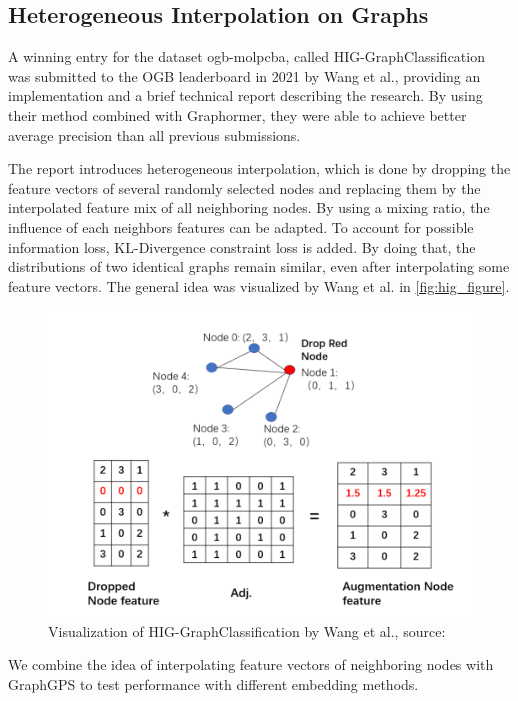 \subsection{Heterogeneous Interpolation on Graphs}
A winning entry for the dataset ogb-molpcba, called HIG-GraphClassification~\cite{tencenc2021Hig,tencenc2021HigPaper} was submitted to the OGB leaderboard in 2021 by Wang et al., providing an implementation and a brief technical report describing the research. By using their method combined with Graphormer, they were able to achieve better average precision than all previous submissions.

The report introduces heterogeneous interpolation, which is done by dropping the feature vectors of several randomly selected nodes and replacing them by the interpolated feature mix of all neighboring nodes.
By using a mixing ratio, the influence of each neighbors features can be adapted. To account for possible information loss, KL-Divergence constraint loss is added. By doing that, the distributions of two identical graphs remain similar, even after interpolating some feature vectors. The general idea was visualized by Wang et al. in \autoref{fig:hig_figure}.

\begin{figure}[ht!]
    \centering
    \includegraphics[scale=0.3]{tex/res/hig_figure.png}
    \caption{Visualization of HIG-GraphClassification by Wang et al., \tiny{source: \cite{tencenc2021HigPaper}}}
    \label{fig:hig_figure}
\end{figure}

We combine the idea of interpolating feature vectors of neighboring nodes with GraphGPS to test performance with different embedding methods.